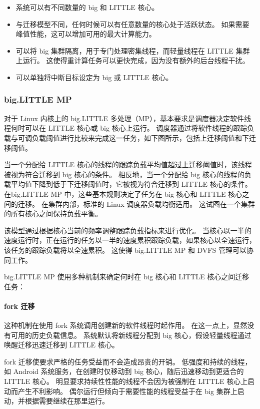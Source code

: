 \begin{itemize}
\item
  系统可以有不同数量的 big 和 LITTLE 核心。
\item
  与迁移模型不同，任何时候可以有任意数量的核心处于活跃状态。
  如果需要峰值性能，这可以增加可用的最大计算能力。
\item
  可以将 big 集群隔离，用于专门处理密集线程，而轻量线程在 LITTLE 集群上运行。
  这使得重计算任务可以更快完成，因为没有额外的后台线程干扰。
\item
  可以单独将中断目标设定为 big 或 LITTLE 核心。
\end{itemize}

\subsubsection{big.LITTLE MP}

对于 Linux 内核上的 big.LITTLE 多处理（MP），基本要求是调度器决定软件线程何时可以在 LITTLE 核心或 big 核心上运行。
调度器通过将软件线程的跟踪负载与可调负载阈值进行比较来完成这一任务，如下图所示，包括上迁移阈值和下迁移阈值。


当一个分配给 LITTLE 核心的线程的跟踪负载平均值超过上迁移阈值时，该线程被视为符合迁移到 big 核心的条件。
相反地，当一个分配给 big 核心的线程的负载平均值下降到低于下迁移阈值时，它被视为符合迁移到 LITTLE 核心的条件。
在big.LITTLE MP 中，这些基本规则决定了任务在 big 核心和 LITTLE 核心之间的迁移。
在集群内部，标准的 Linux 调度器负载均衡适用。
这试图在一个集群的所有核心之间保持负载平衡。

该模型通过根据核心当前的频率调整跟踪负载指标来进行优化。
当核心以一半的速度运行时，正在运行的任务以一半的速度累积跟踪负载，如果核心以全速运行，该任务的跟踪负载将以全速累积。
这使得 big.LITTLE MP 和 DVFS 管理可以协同工作。

big.LITTLE MP 使用多种机制来确定何时在 big 核心和 LITTLE 核心之间迁移任务：

\paragraph*{fork 迁移}

这种机制在使用 fork 系统调用创建新的软件线程时起作用。
在这一点上，显然没有可用的历史负载信息。
系统默认将新线程分配到 big 核心，假设轻量线程通过唤醒迁移迅速迁移到 LITTLE 核心。

fork 迁移使要求严格的任务受益而不会造成昂贵的开销。
低强度和持续的线程，如 Android 系统服务，在创建时仅移动到 big 核心，随后迅速移动到更适合的 LITTLE 核心。
明显要求持续性性能的线程不会因为被强制在 LITTLE 核心上启动而产生不利影响。
偶尔运行但倾向于需要性能的线程受益于在 big 集群上启动，并根据需要继续在那里运行。

